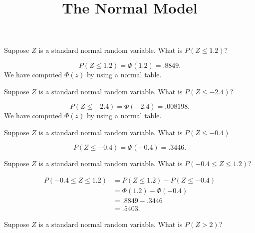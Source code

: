 \documentclass[11pt]{exam}
\title{The Normal Model}
\begin{document}
\begin{questions}

  


\question  Suppose $Z$ is a standard normal random variable.  What is $P(Z \leq
1.2)$?

\begin{solution}
\[
  P(Z \leq 1.2) = \Phi(1.2) = .8849.
\]
We have computed $\Phi(z)$ by using a normal table.
\end{solution}



\question  Suppose $Z$ is a standard normal random variable.  What is $P(Z \leq
-2.4)$?

\begin{solution}
\[
  P(Z \leq -2.4) = \Phi(-2.4) = .008198.
\]
We have computed $\Phi(z)$ by using a normal table.
\end{solution}



\question Suppose $Z$ is a standard normal random variable.  What is $P(Z \leq
-0.4)$

\begin{solution}
\[
  P(Z \leq -0.4) = \Phi(-0.4) = .3446.
\]
\end{solution}



\question Suppose $Z$ is a standard normal random variable.  What is $P(-0.4 \leq
Z \leq 1.2)$?

\begin{solution}
\begin{align*}
  P(-0.4 \leq Z \leq 1.2) &= P(Z \leq 1.2) - P(Z \leq -0.4) \\
  	&= \Phi(1.2) - \Phi(-0.4) \\
	&= .8849 - .3446 \\
	&= .5403.
\end{align*}
\end{solution}



\question Suppose $Z$ is a standard normal random variable.  What is $P(Z > 2)$?


\end{questions}
\end{document}
